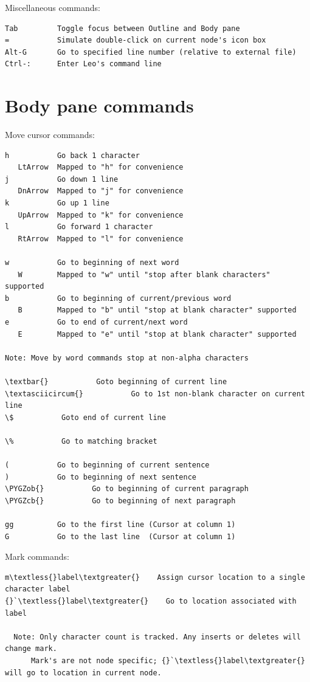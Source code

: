 \documentclass[a4paper,10pt,english]{sphinxmanual}
\def\PYGZob{\char`\{}
\def\PYGZcb{\char`\}}
\begin{document}
Miscellaneous commands:

\begin{Verbatim}[commandchars=\\\{\}]
Tab         Toggle focus between Outline and Body pane
=           Simulate double-click on current node's icon box
Alt-G       Go to specified line number (relative to external file)
Ctrl-:      Enter Leo's command line
\end{Verbatim}


\section{Body pane commands}
\label{vimBindings:body-pane-commands}
Move cursor commands:

\begin{Verbatim}[commandchars=\\\{\}]
h           Go back 1 character
   LtArrow  Mapped to "h" for convenience
j           Go down 1 line
   DnArrow  Mapped to "j" for convenience
k           Go up 1 line
   UpArrow  Mapped to "k" for convenience
l           Go forward 1 character
   RtArrow  Mapped to "l" for convenience

w           Go to beginning of next word
   W        Mapped to "w" until "stop after blank characters" supported
b           Go to beginning of current/previous word
   B        Mapped to "b" until "stop at blank character" supported
e           Go to end of current/next word
   E        Mapped to "e" until "stop at blank character" supported

Note: Move by word commands stop at non-alpha characters

\textbar{}           Goto beginning of current line
\textasciicircum{}           Go to 1st non-blank character on current line
\$           Goto end of current line

\%           Go to matching bracket

(           Go to beginning of current sentence
)           Go to beginning of next sentence
\PYGZob{}           Go to beginning of current paragraph
\PYGZcb{}           Go to beginning of next paragraph

gg          Go to the first line (Cursor at column 1)
G           Go to the last line  (Cursor at column 1)
\end{Verbatim}

Mark commands:

\begin{Verbatim}[commandchars=\\\{\}]
m\textless{}label\textgreater{}    Assign cursor location to a single character label
{}`\textless{}label\textgreater{}    Go to location associated with label

  Note: Only character count is tracked. Any inserts or deletes will change mark.
      Mark's are not node specific; {}`\textless{}label\textgreater{} will go to location in current node.
\end{Verbatim}
\end{document}

